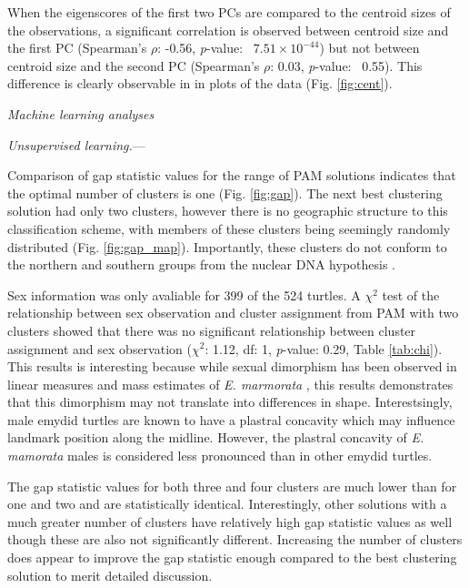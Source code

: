 \documentclass[12pt,letterpaper]{article}\usepackage{graphicx, color}
\renewcommand{\subsection}[1]{%
\bigskip
\begin{center}
\begin{large}
\normalfont\itshape #1
\end{large}
\end{center}}
\renewcommand{\subsubsection}[1]{%
\vspace{2ex}
\noindent
\textit{#1.}---}
\begin{document}
When the eigenscores of the first two PCs are compared to the centroid sizes of the observations, a significant correlation is observed between centroid size and the first PC (Spearman's \(\rho\): -0.56, \textit{p}-value: ~\ensuremath{7.51\times 10^{-44}}) but not between centroid size and the second PC (Spearman's \(\rho\): 0.03, \textit{p}-value: ~0.55). This difference is clearly observable in in plots of the data (Fig. \ref{fig:cent}).



\subsection{Machine learning analyses}
\subsubsection{Unsupervised learning}

Comparison of gap statistic values for the range of PAM solutions indicates that the optimal number of clusters is one (Fig. \ref{fig:gap}). The next best clustering solution had only two clusters, however there is no geographic structure to this classification scheme, with members of these clusters being seemingly randomly distributed (Fig. \ref{fig:gap_map}). Importantly, these clusters do not conform to the northern and southern groups from the nuclear DNA hypothesis \citep{Spinks2010}.

Sex information was only avaliable for 399 of the 524 turtles. A \(\chi^{2}\) test of the relationship between sex observation and cluster assignment from PAM with two clusters showed that there was no significant relationship between cluster assignment and sex observation (\(\chi^{2}\): 1.12, df: 1, \textit{p}-value: 0.29, Table \ref{tab:chi}). This results is interesting because while sexual dimorphism has been observed in linear measures and mass estimates of \textit{E. marmorata} \citep{Lubcke2007,Germano2009,Holland1992}, this results demonstrates that this dimorphism may not translate into differences in shape. Interestsingly, male emydid turtles are known to have a plastral concavity which may influence landmark position along the midline. However, the plastral concavity of \textit{E. mamorata} males is considered less pronounced than in other emydid turtles.


The gap statistic values for both three and four clusters are much lower than for one and two and are statistically identical. Interestingly, other solutions with a much greater number of clusters have relatively high gap statistic values as well though these are also not significantly different. Increasing the number of clusters does appear to improve the gap statistic enough compared to the best clustering solution to merit detailed discussion.
\end{document}
